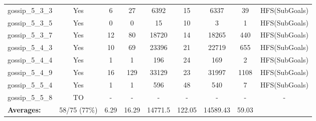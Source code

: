 \documentclass{article}
\begin{document}
\begin{tabular}{lcccccccc}
gossip\_5\_3\_3 & Yes & 6 & 27 & 6392 & 15 & 6337 & 39 & HFS(SubGoals) \\
gossip\_5\_3\_5 & Yes & 0 & 0 & 15 & 10 & 3 & 1 & HFS(SubGoals) \\
gossip\_5\_3\_7 & Yes & 12 & 80 & 18720 & 14 & 18265 & 440 & HFS(SubGoals) \\
gossip\_5\_4\_3 & Yes & 10 & 69 & 23396 & 21 & 22719 & 655 & HFS(SubGoals) \\
gossip\_5\_4\_4 & Yes & 1 & 1 & 196 & 24 & 169 & 2 & HFS(SubGoals) \\
gossip\_5\_4\_9 & Yes & 16 & 129 & 33129 & 23 & 31997 & 1108 & HFS(SubGoals) \\
gossip\_5\_5\_4 & Yes & 1 & 1 & 596 & 48 & 540 & 7 & HFS(SubGoals) \\
gossip\_5\_5\_8 & TO & - & - & - & - & - & - & - \\
\textbf{Averages:} & 58/75 (77\%) & 6.29 & 16.29 & 14771.5 & 122.05 & 14589.43 & 59.03 & \\
\bottomrule
\end{tabular}
\\[0.7cm]
\end{document}
